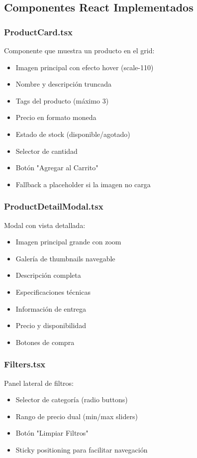 \documentclass[12pt,a4paper]{article}
\begin{document}
\subsection{Componentes React Implementados}

\subsubsection{ProductCard.tsx}

Componente que muestra un producto en el grid:
\begin{itemize}
    \item Imagen principal con efecto hover (scale-110)
    \item Nombre y descripción truncada
    \item Tags del producto (máximo 3)
    \item Precio en formato moneda
    \item Estado de stock (disponible/agotado)
    \item Selector de cantidad
    \item Botón "Agregar al Carrito"
    \item Fallback a placeholder si la imagen no carga
\end{itemize}

\subsubsection{ProductDetailModal.tsx}

Modal con vista detallada:
\begin{itemize}
    \item Imagen principal grande con zoom
    \item Galería de thumbnails navegable
    \item Descripción completa
    \item Especificaciones técnicas
    \item Información de entrega
    \item Precio y disponibilidad
    \item Botones de compra
\end{itemize}

\subsubsection{Filters.tsx}

Panel lateral de filtros:
\begin{itemize}
    \item Selector de categoría (radio buttons)
    \item Rango de precio dual (min/max sliders)
    \item Botón "Limpiar Filtros"
    \item Sticky positioning para facilitar navegación
\end{itemize}
\end{document}
